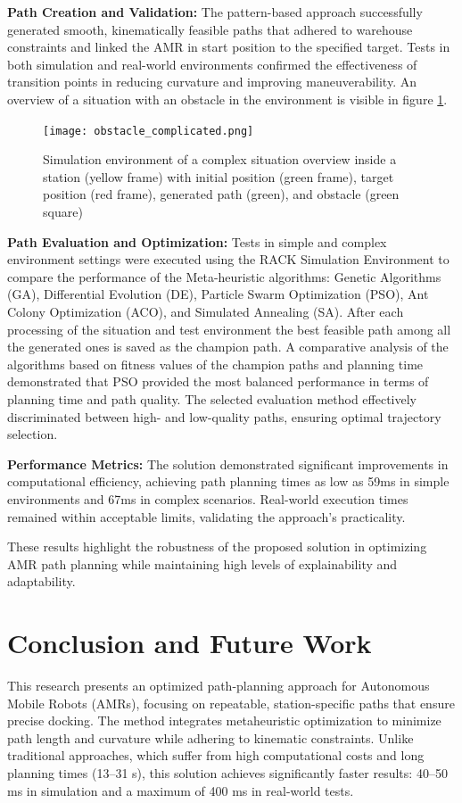 \documentclass{amam}                %
\begin{document}
\noindent \textbf{Path Creation and Validation:} The pattern-based approach successfully generated smooth, kinematically feasible paths that adhered to warehouse constraints and linked the AMR in start position to the specified target. Tests in both simulation and real-world environments confirmed the effectiveness of transition points in reducing curvature and improving maneuverability. An overview of a situation with an obstacle in the environment is visible in figure \ref{obstacle}. 

\begin{figure}[t]
  \centering \texttt{[image: obstacle\_complicated.png]}
  \caption{Simulation environment of a complex situation overview inside a station (yellow frame) with initial position (green frame), target position (red frame), generated path (green), and obstacle (green square) }
  \label{obstacle}
\end{figure}

\noindent \textbf{Path Evaluation and Optimization:} 
Tests in simple and complex environment settings were executed using the 
RACK Simulation Environment to compare the performance of the Meta-heuristic algorithms: Genetic Algorithms (GA), Differential Evolution (DE), Particle Swarm Optimization (PSO), Ant Colony Optimization (ACO), and Simulated Annealing (SA). After each processing of the situation and test environment the best feasible path among all the generated ones is saved as the champion path. 
A comparative analysis of the algorithms based on fitness values of the champion paths and planning time demonstrated that PSO provided the most balanced performance in terms of planning time and path quality. The selected evaluation method effectively discriminated between high- and low-quality paths, ensuring optimal trajectory selection.  

\noindent \textbf{Performance Metrics:} The solution demonstrated significant improvements in computational efficiency, achieving path planning times as low as 59ms in simple environments and 67ms in complex scenarios. Real-world execution times remained within acceptable limits, validating the approach’s practicality.

These results highlight the robustness of the proposed solution in optimizing AMR path planning while maintaining high levels of explainability and adaptability.

\section{Conclusion and Future Work}
This research presents an optimized path-planning approach for Autonomous Mobile Robots (AMRs), focusing on repeatable, station-specific paths that ensure precise docking. The method integrates metaheuristic optimization to minimize path length and curvature while adhering to kinematic constraints. Unlike traditional approaches, which suffer from high computational costs and long planning times (13–31 s), this solution achieves significantly faster results: 40–50 ms in simulation and a maximum of 400 ms in real-world tests.
\end{document}
